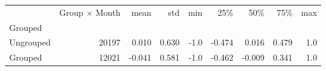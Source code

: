 \begin{tabular}{lrrrrrrrr}
\toprule
{} &  Group $\times$ Month &   mean &    std &  min &    25\% &    50\% &    75\% &  max \\
Grouped   &                       &        &        &      &        &        &        &      \\
\midrule
Ungrouped &                 20197 &  0.010 &  0.630 & -1.0 & -0.474 &  0.016 &  0.479 &  1.0 \\
Grouped   &                 12021 & -0.041 &  0.581 & -1.0 & -0.462 & -0.009 &  0.341 &  1.0 \\
\bottomrule
\end{tabular}
